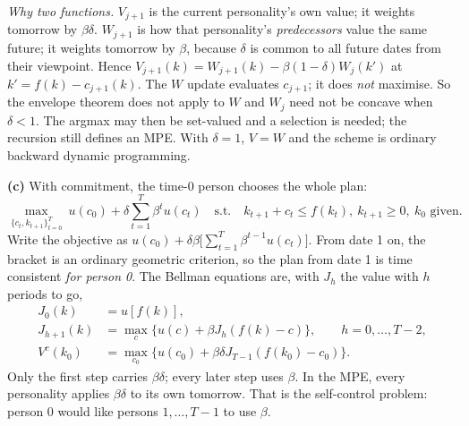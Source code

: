 \documentclass[12pt, letterpaper]{article}
\begin{document}
\begin{tcolorbox}[evenbox,title={Exercise 7.6 \quad Self-control}]
\emph{Why two functions.} $V_{j+1}$ is the current personality's own value; it weights tomorrow
by $\beta\delta$. $W_{j+1}$ is how that personality's \emph{predecessors} value the same future; it
weights tomorrow by $\beta$, because $\delta$ is common to all future dates from their viewpoint.
Hence $V_{j+1}(k)=W_{j+1}(k)-\beta(1-\delta)W_j(k')$ at $k'=f(k)-c_{j+1}(k)$. The $W$ update
evaluates $c_{j+1}$; it does \emph{not} maximise. So the envelope theorem does not apply to $W$ and
$W_j$ need not be concave when $\delta<1$. The argmax may then be set-valued and a selection is
needed; the recursion still defines an MPE. With $\delta=1$, $V=W$ and the scheme is ordinary
backward dynamic programming.

\textbf{(c)} With commitment, the time-0 person chooses the whole plan:
\[
\max_{\{c_t,k_{t+1}\}_{t=0}^T}\ u(c_0)+\delta\sum_{t=1}^T\beta^tu(c_t)
\quad\text{s.t.}\quad k_{t+1}+c_t\le f(k_t),\ k_{t+1}\ge0,\ k_0\text{ given}.
\]
Write the objective as $u(c_0)+\delta\beta\big[\sum_{t=1}^{T}\beta^{t-1}u(c_t)\big]$. From date 1 on,
the bracket is an ordinary geometric criterion, so the plan from date 1 is time consistent
\emph{for person 0}. The Bellman equations are, with $J_h$ the value with $h$ periods to go,
\begin{align*}
J_0(k)&=u[f(k)],\\
J_{h+1}(k)&=\max_c\{u(c)+\beta J_h(f(k)-c)\},\qquad h=0,\dots,T-2,\\
V^{c}(k_0)&=\max_{c_0}\{u(c_0)+\beta\delta J_{T-1}(f(k_0)-c_0)\}.
\end{align*}
Only the first step carries $\beta\delta$; every later step uses $\beta$. In the MPE, every
personality applies $\beta\delta$ to its own tomorrow. That is the self-control problem: person 0
would like persons $1,\dots,T-1$ to use $\beta$.


\end{tcolorbox}
\end{document}
